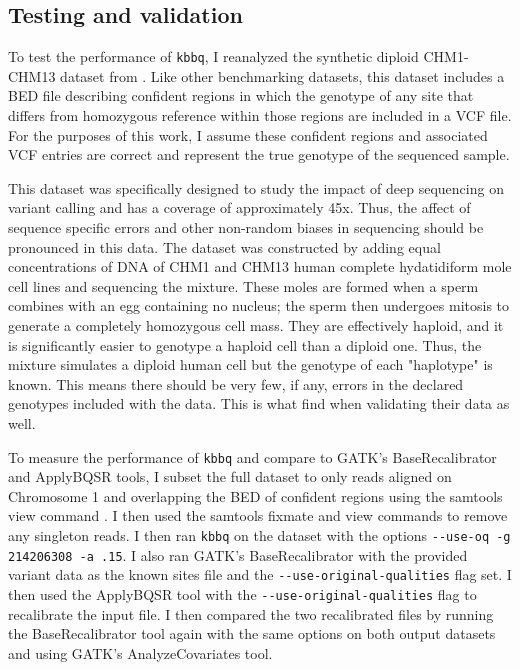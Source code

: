 \subsection{Testing and validation}
To test the performance of \texttt{kbbq}, I reanalyzed the synthetic diploid CHM1-CHM13 dataset from \cite{li_synthetic-diploid_2018}. Like other benchmarking datasets, this dataset includes a BED file describing confident regions in which the genotype of any site that differs from homozygous reference within those regions are included in a VCF file. For the purposes of this work, I assume these confident regions and associated VCF entries are correct and represent the true genotype of the sequenced sample.

This dataset was specifically designed to study the impact of deep sequencing on variant calling and has a coverage of approximately 45x. Thus, the affect of sequence specific errors and other non-random biases in sequencing should be pronounced in this data.
The dataset was constructed by adding equal concentrations of DNA of CHM1 and CHM13 human complete hydatidiform mole cell lines and sequencing the mixture. These moles are formed when a sperm combines with an egg containing no nucleus; the sperm then undergoes mitosis to generate a completely homozygous cell mass. They are effectively haploid, and it is significantly easier to genotype a haploid cell than a diploid one. Thus, the mixture simulates a diploid human cell but the genotype of each "haplotype" is known. This means there should be very few, if any, errors in the declared genotypes included with the data. This is what \cite{li_synthetic-diploid_2018} find when validating their data as well.

To measure the performance of \texttt{kbbq} and compare to GATK's BaseRecalibrator and ApplyBQSR tools, I subset the full dataset to only reads aligned on Chromosome 1 and overlapping the BED of confident regions using the samtools view command \parencite{li_sequence_2009}. I then used the samtools fixmate and view commands to remove any singleton reads. I then ran \texttt{kbbq} on the dataset with the options \texttt{-\phantom{}-use-oq -g 214206308 -a .15}. I also ran GATK's BaseRecalibrator with the provided variant data as the known sites file and the \texttt{-\phantom{}-use-original-qualities} flag set. I then used the ApplyBQSR tool with the \texttt{-\phantom{}-use-original-qualities} flag to recalibrate the input file. I then compared the two recalibrated files by running the BaseRecalibrator tool again with the same options on both output datasets and using GATK's AnalyzeCovariates tool.

